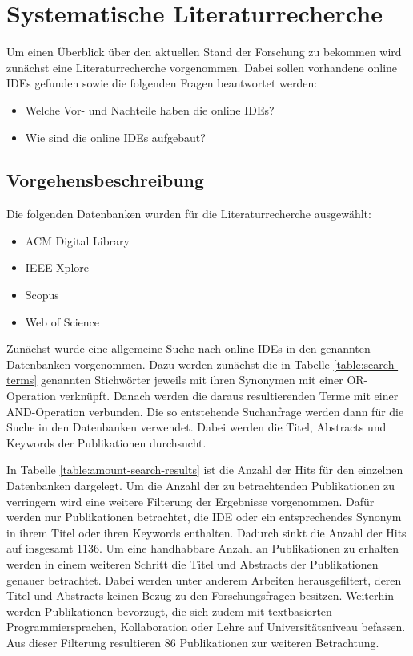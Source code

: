 \chapter{Systematische Literaturrecherche} \label{systematische_literaturrecherche}

Um einen Überblick über den aktuellen Stand der Forschung zu bekommen wird zunächst eine Literaturrecherche vorgenommen. Dabei sollen vorhandene online IDEs gefunden sowie die folgenden Fragen beantwortet werden:

\begin{itemize}
    \item Welche Vor- und Nachteile haben die online IDEs?
    \item Wie sind die online IDEs aufgebaut?
\end{itemize}

\section{Vorgehensbeschreibung}

Die folgenden Datenbanken wurden für die Literaturrecherche ausgewählt:

\begin{itemize}
    \item ACM Digital Library
    \item IEEE Xplore
    \item Scopus
    \item Web of Science
\end{itemize}

Zunächst wurde eine allgemeine Suche nach online IDEs in den genannten Datenbanken vorgenommen. Dazu werden zunächst die in Tabelle \ref{table:search-terms} genannten Stichwörter jeweils mit ihren Synonymen mit einer OR-Operation verknüpft. Danach werden die daraus resultierenden Terme mit einer AND-Operation verbunden. Die so entstehende Suchanfrage werden dann für die Suche in den Datenbanken verwendet. Dabei werden die Titel, Abstracts und Keywords der Publikationen durchsucht.

In Tabelle \ref{table:amount-search-results} ist die Anzahl der Hits für den einzelnen Datenbanken dargelegt. Um die Anzahl der zu betrachtenden Publikationen zu verringern wird eine weitere Filterung der Ergebnisse vorgenommen. Dafür werden nur Publikationen betrachtet, die IDE oder ein entsprechendes Synonym in ihrem Titel oder ihren Keywords enthalten. Dadurch sinkt die Anzahl der Hits auf insgesamt $1136$. Um eine handhabbare Anzahl an Publikationen zu erhalten werden in einem weiteren Schritt die Titel und Abstracts der Publikationen genauer betrachtet. Dabei werden unter anderem Arbeiten herausgefiltert, deren Titel und Abstracts keinen Bezug zu den Forschungsfragen besitzen. Weiterhin werden Publikationen bevorzugt, die sich zudem mit textbasierten Programmiersprachen, Kollaboration oder Lehre auf Universitätsniveau befassen. Aus dieser Filterung resultieren $86$ Publikationen zur weiteren Betrachtung.

